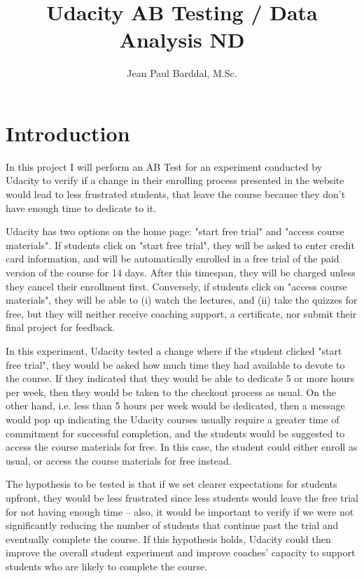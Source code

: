 \documentclass[11pt]{article}
\begin{document}
\title{Udacity AB Testing / Data Analysis ND}
\author{Jean Paul Barddal, M.Sc.}
\maketitle

\section{Introduction}

	In this project I will perform an AB Test for an experiment conducted by Udacity to verify if a change in their enrolling process presented in the website would lead to less frustrated students, that leave the course because they don't have enough time to dedicate to it.
	
	Udacity has two options on the home page: "start free trial" and "access course materials".
	If students click on "start free trial", they will be asked to enter credit card information, and will be automatically enrolled in a free trial of the paid version of the course for 14 days.
	After this timespan, they will be charged unless they cancel their enrollment first.
	Conversely, if students click on "access course materials", they will be able to (i) watch the lectures, and (ii) take the quizzes for free, but they will neither receive coaching support, a certificate, nor submit their final project for feedback.
	
	In this experiment, Udacity tested a change where if the student clicked "start free trial", they would be asked how much time they had available to devote to the course.
	If they indicated that they would be able to dedicate 5 or more hours per week, then they would be taken to the checkout process as usual.
	On the other hand, i.e. less than 5 hours per week would be dedicated, then a message would pop up indicating the Udacity courses usually require a greater time of commitment for successful completion, and the students would be suggested to access the course materials for free.
	In this case, the student could either enroll as usual, or access the course materials for free instead.
	
	The hypothesis to be tested is that if we set clearer expectations for students upfront, they would be less frustrated since less students would leave the free trial for not having enough time -- also, it would be important to verify if we were not significantly reducing the number of students that continue past the trial and eventually complete the course.
	If this hypothesis holds, Udacity could then improve the overall student experiment and improve coaches' capacity to support students who are likely to complete the course.
	
\end{document}
